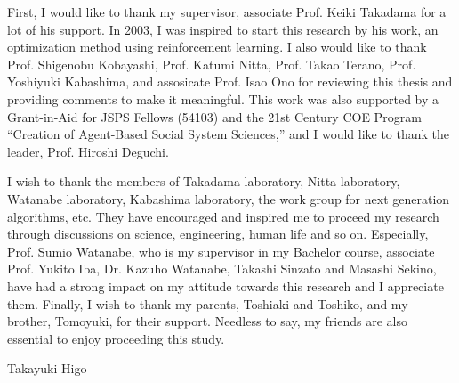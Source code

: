 First, I would like to thank my supervisor, associate Prof. Keiki
Takadama for a lot of his support.
In 2003, I was inspired to start this research 
by his work,  an optimization method using reinforcement learning.
I also would like to thank 
Prof. Shigenobu Kobayashi,
Prof. Katumi Nitta,
Prof. Takao Terano,
Prof. Yoshiyuki Kabashima, and
assosicate Prof. Isao Ono
for reviewing this thesis and providing comments to make it
meaningful. 
This work was also supported by a Grant-in-Aid for JSPS Fellows (54103)
and the 21st Century COE Program
``Creation of Agent-Based Social System Sciences,''
and I would like to thank the leader, Prof. Hiroshi Deguchi.

I wish to thank
the members of Takadama laboratory, 
Nitta laboratory, 
Watanabe laboratory, 
Kabashima laboratory,
the work group for next generation algorithms, etc.
They have encouraged and inspired me to
proceed my research through discussions on science,
engineering, human life and so on.
Especially, Prof. Sumio Watanabe,
who is my supervisor in my Bachelor course,
associate Prof. Yukito Iba,
Dr. Kazuho Watanabe, 
Takashi Sinzato and Masashi Sekino,
have had a strong impact on my attitude towards this research 
and I appreciate them.
Finally,
I wish to thank my parents, Toshiaki and Toshiko, and my brother,
Tomoyuki, for their support.
Needless to say, my friends are also essential 
to enjoy proceeding this study.
\begin{flushright}
Takayuki Higo
\end{flushright}
